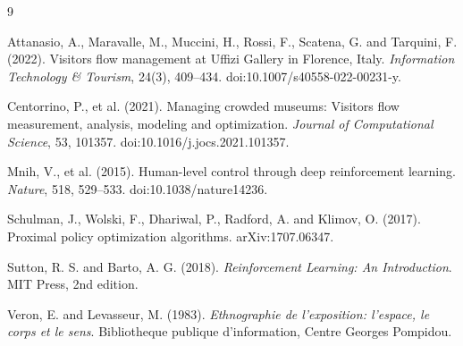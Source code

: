 \documentclass[11pt]{article}
\begin{document}
\begin{thebibliography}{9}

Attanasio, A., Maravalle, M., Muccini, H., Rossi, F., Scatena, G. and Tarquini, F. (2022).
\newblock Visitors flow management at Uffizi Gallery in Florence, Italy.
\newblock \emph{Information Technology \& Tourism}, 24(3), 409--434.
\newblock doi:10.1007/s40558-022-00231-y.

Centorrino, P., et al. (2021).
\newblock Managing crowded museums: Visitors flow measurement, analysis, modeling and optimization.
\newblock \emph{Journal of Computational Science}, 53, 101357.
\newblock doi:10.1016/j.jocs.2021.101357.

Mnih, V., et al. (2015).
\newblock Human-level control through deep reinforcement learning.
\newblock \emph{Nature}, 518, 529--533.
\newblock doi:10.1038/nature14236.

Schulman, J., Wolski, F., Dhariwal, P., Radford, A. and Klimov, O. (2017).
\newblock Proximal policy optimization algorithms.
\newblock arXiv:1707.06347.

Sutton, R. S. and Barto, A. G. (2018).
\newblock \emph{Reinforcement Learning: An Introduction}.
\newblock MIT Press, 2nd edition.

Veron, E. and Levasseur, M. (1983).
\newblock \emph{Ethnographie de l'exposition: l'espace, le corps et le sens}.
\newblock Bibliotheque publique d'information, Centre Georges Pompidou.

\end{thebibliography}
\end{document}

